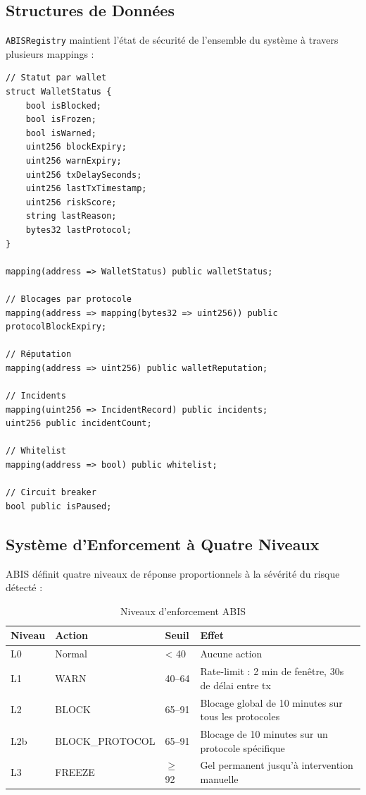 \documentclass[12pt,a4paper]{report}
\newcommand{\code}[1]{\texttt{#1}}
\begin{document}
\subsection{Structures de Données}

\code{ABISRegistry} maintient l'état de sécurité de l'ensemble du système à travers plusieurs mappings :

\begin{lstlisting}[language=Solidity, caption={Structures principales d'ABISRegistry}, label={lst:registry_structs}]
// Statut par wallet
struct WalletStatus {
    bool isBlocked;
    bool isFrozen;
    bool isWarned;
    uint256 blockExpiry;
    uint256 warnExpiry;
    uint256 txDelaySeconds;
    uint256 lastTxTimestamp;
    uint256 riskScore;
    string lastReason;
    bytes32 lastProtocol;
}

mapping(address => WalletStatus) public walletStatus;

// Blocages par protocole
mapping(address => mapping(bytes32 => uint256)) public protocolBlockExpiry;

// Réputation
mapping(address => uint256) public walletReputation;

// Incidents
mapping(uint256 => IncidentRecord) public incidents;
uint256 public incidentCount;

// Whitelist
mapping(address => bool) public whitelist;

// Circuit breaker
bool public isPaused;
\end{lstlisting}

\subsection{Système d'Enforcement à Quatre Niveaux}

ABIS définit quatre niveaux de réponse proportionnels à la sévérité du risque détecté :

\begin{table}[H]
\centering
\caption{Niveaux d'enforcement ABIS}
\label{tab:enforcement_levels}
\begin{tabularx}{\linewidth}{C{1.5cm} C{2.5cm} C{2cm} L{6.5cm}}
\toprule
\textbf{Niveau} & \textbf{Action} & \textbf{Seuil} & \textbf{Effet} \\
\midrule
L0 & Normal   & < 40  & Aucune action \\
L1 & WARN     & 40--64 & Rate-limit : 2 min de fenêtre, 30s de délai entre tx \\
L2 & BLOCK    & 65--91 & Blocage global de 10 minutes sur tous les protocoles \\
L2b & BLOCK\_PROTOCOL & 65--91 & Blocage de 10 minutes sur un protocole spécifique \\
L3 & FREEZE   & $\geq$ 92 & Gel permanent jusqu'à intervention manuelle \\
\bottomrule
\end{tabularx}
\end{table}
\end{document}
